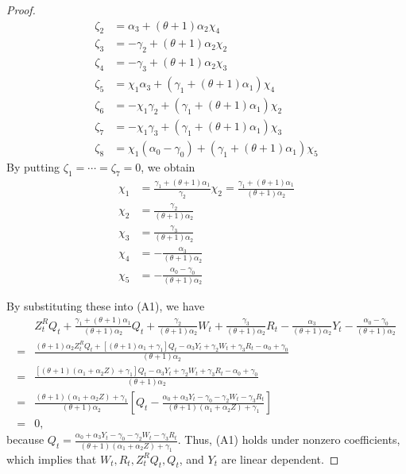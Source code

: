 \documentclass[11pt, a4paper]{article}
\begin{document}
\begin{proof}
\begin{align*}
        \zeta_2 &= \alpha_3+(\theta + 1)\alpha_{2} \chi_4\\
        \zeta_3 &= -\gamma_2+(\theta + 1)\alpha_{2} \chi_2\\
        \zeta_4 & = -\gamma_3+(\theta + 1)\alpha_{2}  \chi_3\\
        \zeta_5 & = \chi_1 \alpha_3+(\gamma_1+(\theta+1)\alpha_1 )\chi_4\\
        \zeta_6 & = -\chi_1\gamma_2+(\gamma_1+(\theta+1)\alpha_1) \chi_2 \\
        \zeta_7 & = -\chi_1\gamma_3+(\gamma_1+(\theta+1)\alpha_1) \chi_3\\
        \zeta_8 & = \chi_1 (\alpha_0 -\gamma_{0})+(\gamma_1+(\theta+1)\alpha_1) \chi_5
    \end{align*}
    By putting $\zeta_1 = \cdots = \zeta_7 =0$, we obtain 
    \begin{align*}
            \chi_1 &= \frac{\gamma_1+(\theta+1)\alpha_1}{\gamma_2}\chi_2=\frac{\gamma_1 + (\theta + 1)\alpha_1}{(\theta + 1)\alpha_{2}}\\
            \chi_2 &= \frac{\gamma_2}{(\theta + 1)\alpha_{2}}\\
            \chi_3 &= \frac{\gamma_3}{(\theta + 1)\alpha_{2}}\\
            \chi_4 &= -\frac{\alpha_3}{(\theta + 1)\alpha_{2}}\\
            \chi_5 &= -\frac{\alpha_0 - \gamma_{0}}{(\theta + 1)\alpha_{2}}
    \end{align*}
    
    By substituting these into (A1),  we have
    \begin{align*}
        &Z^{R}_{t} Q_{t} + \frac{\gamma_1 +(\theta + 1)\alpha_1}{(\theta + 1)\alpha_{2}}Q_{t} +  \frac{\gamma_2}{(\theta + 1)\alpha_{2}} W_{t}+  \frac{\gamma_3}{(\theta + 1)\alpha_{2}}R_{t} -\frac{\alpha_3}{(\theta + 1)\alpha_{2}}Y_{t} -\frac{\alpha_0 - \gamma_{0}}{(\theta + 1)\alpha_{2}} \\
        =&\frac{ (\theta + 1)\alpha_{2}Z^{R}_{t} Q_{t} + [(\theta + 1)\alpha_1 + \gamma_1]Q_{t}  -\alpha_3 Y_{t} + \gamma_2 W_{t}+ \gamma_3 R_{t} - \alpha_0 + \gamma_{0}}{(\theta + 1)\alpha_{2}}\\
        =& \frac{[(\theta + 1)(\alpha_1 + \alpha_{2} Z) + \gamma_1]Q_{t}  -\alpha_3 Y_{t} + \gamma_2 W_{t}+ \gamma_3 R_{t} - \alpha_0 + \gamma_{0}}{(\theta + 1)\alpha_{2}}\\
        =& \frac{(\theta + 1)(\alpha_1 + \alpha_{2} Z) + \gamma_1}{(\theta + 1)\alpha_{2}}\left[ Q_{t} - \frac{\alpha_0 + \alpha_3 Y_{t} - \gamma_{0}- \gamma_2 W_{t}- \gamma_3 R_{t}}{(\theta + 1)(\alpha_1 + \alpha_{2} Z) + \gamma_1}\right]\\
        =& 0,
    \end{align*}
    because $Q_{t} = \frac{\alpha_0 + \alpha_3Y_{t} -\gamma_{0} - \gamma_2 W_{t}-  \gamma_3 R_{t}}{(\theta + 1) (\alpha_1 + \alpha_{2} Z) + \gamma_1}$. 
    Thus, (A1) holds under nonzero coefficients, which implies that $W_{t}, R_{t}, Z^{R}_{t}Q_{t},Q_{t}$, and $Y_{t}$ are linear dependent.
    
\end{proof}
\end{document}
